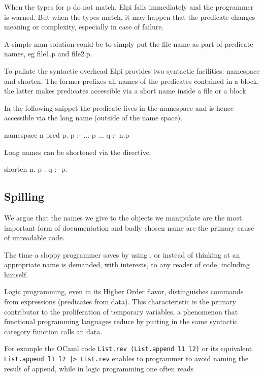 \documentclass[a4paper, 11pt]{book}
\begin{document}
When the types for p do not match, Elpi fails immediately
and the programmer is warned. But when the types match, it may
happen that the predicate changes meaning or complexity,
especially in case of failure.

A simple man solution could be to simply put the file name
as part of predicate names, eg file1.p and file2.p.

To paliate the syntactic overhead Elpi provides two syntactic
facilities: namespace and shorten. The former prefixes all
names of the predicates contained in a block, the latter makes
predicates accessible via a short name inside a file or a block

In the following snippet the predicate  lives in the namespace
 and is hence accessible via the long name  (outside of
the name space).

\begin{elpicode}
namespace n {
  pred p.
  p :- ... p ...
}
q :- n.p
\end{elpicode}

Long names can be shortened via the  directive.

\begin{elpicode}
shorten n.{ p }. %
q :- p.
\end{elpicode}

\subsection{Spilling}\label{sec:spilling}

We argue that the names we give to the objects we manipulate
are the most important form of documentation and badly chosen
name are the primary cause of unreadable code.

The time a sloppy programmer saves by using , 
or  instead of thinking at an appropriate name is
demanded, with interests, to any reader of code, including himself.

Logic programming, even in its Higher Order flavor, distinguishes
commands from expressions (predicates from data). This characteristic
is the primary contributor to the proliferation of temporary
variables, a phenomenon that functional programming languages
reduce by putting in the same syntactic category function calls an
data. 

For example the OCaml code \texttt{List.rev (List.append l1 l2)}
or its equivalent \texttt{List.append l1 l2 |> List.rev} enables
to programmer to avoid naming the result of append, while in logic
programming one often reads
\end{document}

